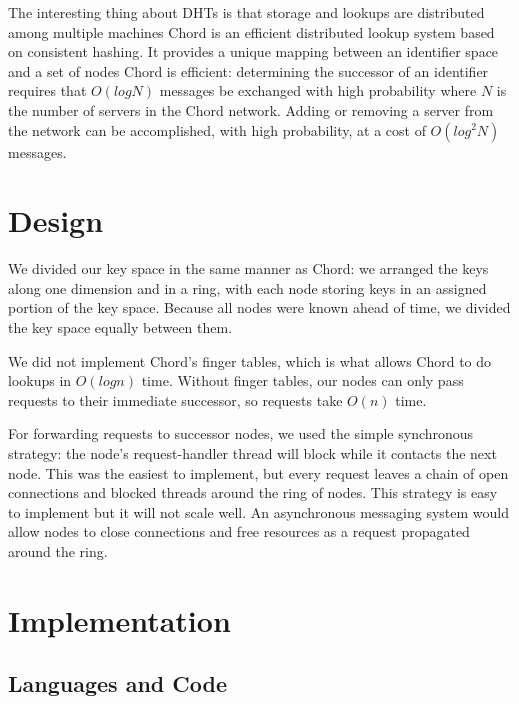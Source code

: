 \documentclass[11pt,conference]{IEEEtran}
\begin{document}
The interesting thing about DHTs is that storage and lookups are distributed among multiple machines \cite{linuxjournal_dht}
Chord is an efficient distributed lookup system based on consistent hashing. It provides a
unique mapping between an identifier space and a set of nodes \cite{chord}
\newline
Chord is efficient: determining the successor of an identifier requires that $O(log N)$ messages be exchanged with high probability where $N$ is the number of servers in the
Chord network. Adding or removing a server from the network
can be accomplished, with high probability, at a cost of $O(log^2 N)$ messages.
\cite{chord}
\fi


\section{Design}

We divided our key space in the same manner as Chord: we arranged the keys along
one dimension and in a ring, with each node storing keys in an assigned portion
of the key space. Because all nodes were known ahead of time, we divided the key
space equally between them.

We did not implement Chord's finger tables, which is what allows Chord to do
lookups in $O(log n)$ time. Without finger tables, our nodes can only pass
requests to their immediate successor, so requests take $O(n)$ time.

For forwarding requests to successor nodes, we used the simple synchronous
strategy: the node's request-handler thread will block while it contacts the
next node. This was the easiest to implement, but every request leaves a chain
of open connections and blocked threads around the ring of nodes. This strategy
is easy to implement but it will not scale well. An asynchronous messaging
system would allow nodes to close connections and free resources as a request
propagated around the ring.




\section{Implementation}


\subsection{Languages and Code}
\end{document}
